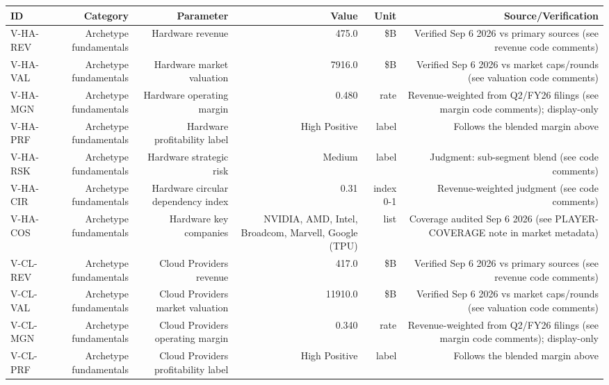 

\begin{tabular}{@{}lrrrrr@{}}
\toprule
ID & Category & Parameter & Value & Unit & Source/Verification \\
\midrule
V-HA-REV & Archetype fundamentals & Hardware revenue & 475.0 & \$B & Verified Sep 6 2026 vs primary sources (see revenue code comments) \\
V-HA-VAL & Archetype fundamentals & Hardware market valuation & 7916.0 & \$B & Verified Sep 6 2026 vs market caps/rounds (see valuation code comments) \\
V-HA-MGN & Archetype fundamentals & Hardware operating margin & 0.480 & rate & Revenue-weighted from Q2/FY26 filings (see margin code comments); display-only \\
V-HA-PRF & Archetype fundamentals & Hardware profitability label & High Positive & label & Follows the blended margin above \\
V-HA-RSK & Archetype fundamentals & Hardware strategic risk & Medium & label & Judgment: sub-segment blend (see code comments) \\
V-HA-CIR & Archetype fundamentals & Hardware circular dependency index & 0.31 & index 0-1 & Revenue-weighted judgment (see code comments) \\
V-HA-COS & Archetype fundamentals & Hardware key companies & NVIDIA, AMD, Intel, Broadcom, Marvell, Google (TPU) & list & Coverage audited Sep 6 2026 (see PLAYER-COVERAGE note in market metadata) \\
V-CL-REV & Archetype fundamentals & Cloud Providers revenue & 417.0 & \$B & Verified Sep 6 2026 vs primary sources (see revenue code comments) \\
V-CL-VAL & Archetype fundamentals & Cloud Providers market valuation & 11910.0 & \$B & Verified Sep 6 2026 vs market caps/rounds (see valuation code comments) \\
V-CL-MGN & Archetype fundamentals & Cloud Providers operating margin & 0.340 & rate & Revenue-weighted from Q2/FY26 filings (see margin code comments); display-only \\
V-CL-PRF & Archetype fundamentals & Cloud Providers profitability label & High Positive & label & Follows the blended margin above \\

\end{tabular}
